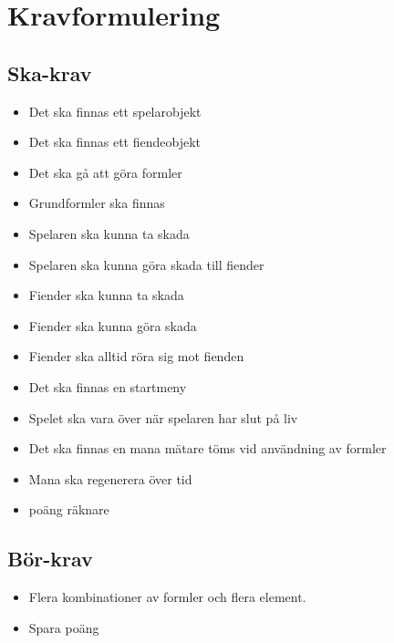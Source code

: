 \documentclass[12pt]{TDP005mall}
\begin{document}
\section{Kravformulering}

\subsection{Ska-krav}
\begin{itemize}
\item Det ska finnas ett spelarobjekt
\item Det ska finnas ett fiendeobjekt
\item Det ska gå att göra formler
\item Grundformler ska finnas
\item Spelaren ska kunna ta skada
\item Spelaren ska kunna göra skada till fiender
\item Fiender ska kunna ta skada
\item Fiender ska kunna göra skada
\item Fiender ska alltid röra sig mot fienden
\item Det ska finnas en startmeny
\item Spelet ska vara över när spelaren har slut på liv
\item Det ska finnas en mana mätare töms vid användning av formler
\item Mana ska regenerera över tid
\item poäng räknare
\end{itemize}

\subsection{Bör-krav}
\begin{itemize}
\item Flera kombinationer av formler och flera element.
\item Spara poäng
\end{itemize}
\end{document}
